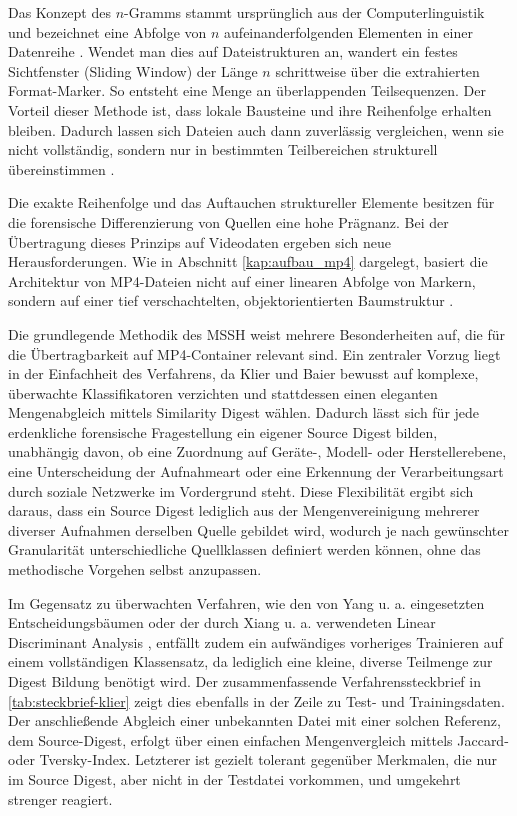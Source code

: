 Das Konzept des $n$-Gramms stammt ursprünglich aus der Computerlinguistik und bezeichnet eine Abfolge von $n$ aufeinanderfolgenden Elementen in einer Datenreihe \cite[Kap. 3]{jurafsky_speech_2026}. Wendet man dies auf Dateistrukturen an, wandert ein festes Sichtfenster (Sliding Window) der Länge $n$ schrittweise über die extrahierten Format-Marker. So entsteht eine Menge an überlappenden Teilsequenzen. Der Vorteil dieser Methode ist, dass lokale Bausteine und ihre Reihenfolge erhalten bleiben. Dadurch lassen sich Dateien auch dann zuverlässig vergleichen, wenn sie nicht vollständig, sondern nur in bestimmten Teilbereichen strukturell übereinstimmen \cite[Kap. 3.2]{klier_media_2025}.

Die exakte Reihenfolge und das Auftauchen struktureller Elemente besitzen für die forensische Differenzierung von Quellen eine hohe Prägnanz. Bei der Übertragung dieses Prinzips auf Videodaten ergeben sich neue Herausforderungen. Wie in Abschnitt \ref{kap:aufbau_mp4} dargelegt, basiert die Architektur von MP4-Dateien nicht auf einer linearen Abfolge von Markern, sondern auf einer tief verschachtelten, objektorientierten Baumstruktur \cite[Kap. 4]{iso_14496-12_2022}.

Die grundlegende Methodik des MSSH weist mehrere Besonderheiten auf, die für die Übertragbarkeit auf MP4-Container relevant sind. Ein zentraler Vorzug liegt in der Einfachheit des Verfahrens, da Klier und Baier bewusst auf komplexe, überwachte Klassifikatoren verzichten und stattdessen einen eleganten Mengenabgleich mittels Similarity Digest wählen. Dadurch lässt sich für jede erdenkliche forensische Fragestellung ein eigener Source Digest bilden, unabhängig davon, ob eine Zuordnung auf Geräte-, Modell- oder Herstellerebene, eine Unterscheidung der Aufnahmeart oder eine Erkennung der Verarbeitungsart durch soziale Netzwerke im Vordergrund steht. Diese Flexibilität ergibt sich daraus, dass ein Source Digest lediglich aus der Mengenvereinigung mehrerer diverser Aufnahmen derselben Quelle gebildet wird, wodurch je nach gewünschter Granularität unterschiedliche Quellklassen definiert werden können, ohne das methodische Vorgehen selbst anzupassen. \cite[Kap. 3.1]{klier_media_2025}

Im Gegensatz zu überwachten Verfahren, wie den von Yang u. a. eingesetzten Entscheidungsbäumen \cite[Kap. III]{yang_efficient_2020} oder der durch Xiang u. a. verwendeten Linear Discriminant Analysis \cite[Kap. 3.5]{xiang_forensic_2021}, entfällt zudem ein aufwändiges vorheriges Trainieren auf einem vollständigen Klassensatz, da lediglich eine kleine, diverse Teilmenge zur Digest Bildung benötigt wird. Der zusammenfassende Verfahrenssteckbrief in \cref{tab:steckbrief-klier} zeigt dies ebenfalls in der Zeile zu Test- und Trainingsdaten. Der anschließende Abgleich einer unbekannten Datei mit einer solchen Referenz, dem Source-Digest, erfolgt über einen einfachen Mengenvergleich mittels Jaccard- oder Tversky-Index. Letzterer ist gezielt tolerant gegenüber Merkmalen, die nur im Source Digest, aber nicht in der Testdatei vorkommen, und umgekehrt strenger reagiert. \cite[Kap. 3.5]{klier_media_2025} 

